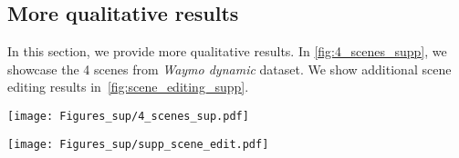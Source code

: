 \subsection{More qualitative results}
\label{sec:sup_visual}
In this section, we provide more qualitative results. In \cref{fig:4_scenes_supp}, we showcase the 4 scenes from \textit{Waymo dynamic} dataset. We show additional scene editing results in~\cref{fig:scene_editing_supp}. 

\begin{figure*}[t]
  \centering
   \texttt{[image: Figures\_sup/4\_scenes\_sup.pdf]}
   \caption{Visualization of 4 selected scenes from \textit{Waymo Dynamic} dataset. For each scene, we aggregate 50 frames. In the first row, points are color-coded by the intensity values(0 ~\bwrDyNFL~ 0.25). In the second row, dynamic vehicles are painted as \textcolor{yellow}{yellow}.}
   \label{fig:4_scenes_supp}
\end{figure*}

\begin{figure*}[t]
  \centering
   \texttt{[image: Figures\_sup/supp\_scene\_edit.pdf]}
   \caption{Visualization of scene editing capabilities. We showcase 3 kinds of scene editing capabilities including vehicle removal(left), trajectory manipulation(middle) and vehicle insertion(right). The first row represents the original scenes, the second row demonstrates the scenes after editing. All points are color-coded by the intensity values(0 ~\bwrDyNFL~ 0.25).}
   \label{fig:scene_editing_supp}
\end{figure*}

